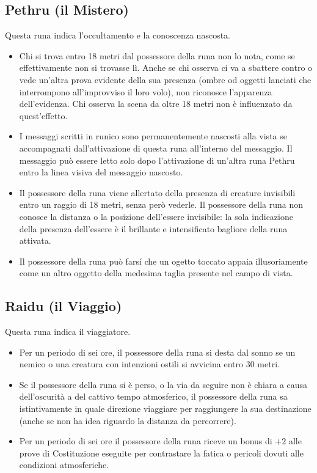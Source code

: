 \documentclass[10pt,a4paper]{article}
\begin{document}
 
\subsection*{Pethru (il Mistero)}
 
Questa runa indica l'occultamento e la conoscenza nascosta.
  \begin{itemize}
\item       Chi si trova entro 18 metri dal possessore della runa non lo nota, come se effettivamente non si trovasse l\`{i}. Anche se chi osserva ci va a sbattere contro o vede un'altra prova evidente della sua presenza (ombre od oggetti lanciati che interrompono all'improvviso il loro volo), non riconosce l'apparenza dell'evidenza. Chi osserva la scena da oltre 18 metri non \`{e} influenzato da quest'effetto.
 
\item       I messaggi scritti in runico sono permanentemente nascosti alla vista se accompagnati dall'attivazione di questa runa all'interno del messaggio. Il messaggio pu\`{o} essere letto solo dopo l'attivazione di un'altra runa Pethru entro la linea visiva del messaggio nascosto.
 
\item        Il possessore della runa viene allertato della presenza di creature invisibili entro un raggio di 18 metri, senza per\`{o} vederle. Il possessore della runa non conosce la distanza o la posizione dell'essere invisibile: la sola indicazione della presenza dell'essere \`{e} il brillante e intensificato bagliore della runa attivata.

\item 		Il possessore della runa pu\`{o} fars\'{i} che un ogetto toccato appaia illusoriamente come un altro oggetto della medesima taglia presente nel campo di vista.
 \end{itemize}
 
 
\subsection*{Raidu (il Viaggio)}
 
Questa runa indica il viaggiatore.
\begin{itemize}
 \item       Per un periodo di sei ore, il possessore della runa si desta dal sonno se un nemico o una creatura con intenzioni ostili si avvicina entro 30 metri.

\item       Se il possessore della runa si \`{e} perso, o la via da seguire non \`{e} chiara a causa dell'oscurit\`{a} a del cattivo tempo atmosferico, il possessore della runa sa istintivamente in quale direzione viaggiare per raggiungere la sua destinazione (anche se non ha idea riguardo la distanza da percorrere).
 
\item        Per un periodo di sei ore il possessore della runa riceve un bonus di $+2$ alle prove di Costituzione eseguite per contrastare la fatica o pericoli dovuti alle condizioni atmosferiche.
 \end{itemize}
 
\end{document}
